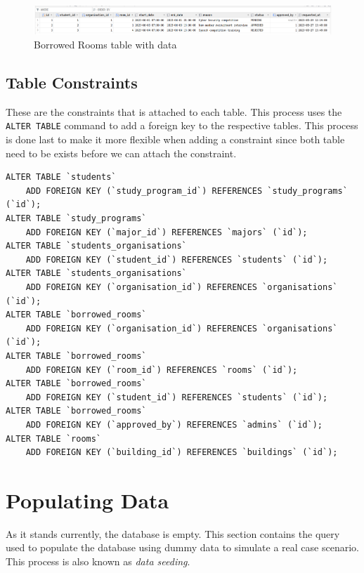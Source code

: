 \documentclass[12pt,titlepage]{article}
\begin{document}
\pagebreak

\begin{figure}[h]
    \centering
    \includegraphics[width=\textwidth]{./images/borrowed-rooms-table.png}
    \caption{Borrowed Rooms table with data}
\end{figure}

\subsection{Table Constraints}
These are the constraints that is attached to each table. This process uses the \texttt{ALTER TABLE} command
to add a foreign key to the respective tables. This process is done last to make it more flexible when adding a constraint
since both table need to be exists before we can attach the constraint.

\begin{verbatim}
ALTER TABLE `students`
    ADD FOREIGN KEY (`study_program_id`) REFERENCES `study_programs` (`id`);
ALTER TABLE `study_programs`
    ADD FOREIGN KEY (`major_id`) REFERENCES `majors` (`id`);
ALTER TABLE `students_organisations`
    ADD FOREIGN KEY (`student_id`) REFERENCES `students` (`id`);
ALTER TABLE `students_organisations`
    ADD FOREIGN KEY (`organisation_id`) REFERENCES `organisations` (`id`);
ALTER TABLE `borrowed_rooms`
    ADD FOREIGN KEY (`organisation_id`) REFERENCES `organisations` (`id`);
ALTER TABLE `borrowed_rooms`
    ADD FOREIGN KEY (`room_id`) REFERENCES `rooms` (`id`);
ALTER TABLE `borrowed_rooms`
    ADD FOREIGN KEY (`student_id`) REFERENCES `students` (`id`);
ALTER TABLE `borrowed_rooms`
    ADD FOREIGN KEY (`approved_by`) REFERENCES `admins` (`id`);
ALTER TABLE `rooms`
    ADD FOREIGN KEY (`building_id`) REFERENCES `buildings` (`id`);
\end{verbatim}

\pagebreak

\section{Populating Data}
As it stands currently, the database is empty. This section contains the query used to populate the database
using dummy data to simulate a real case scenario. This process is also known as \textit{data seeding}.
\end{document}
